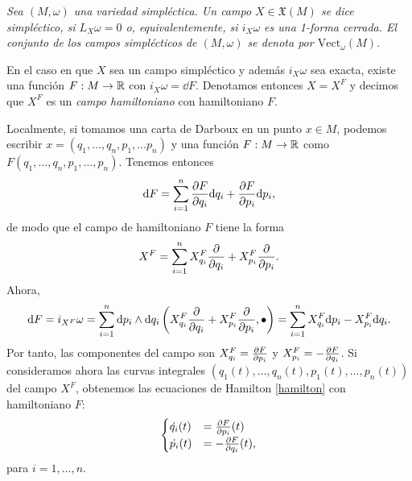 \begin{defn}
  \em
  Sea $(M,\omega)$ una variedad simpléctica. Un campo $X\in \mathfrak{X}(M)$ se dice \emph{simpléctico}, si $L_X\omega=0$ o, equivalentemente, si $i_X\omega$ es una 1-forma cerrada. El conjunto de los campos simplécticos de $(M,\omega)$ se denota por $\mathrm{Vect}_{\omega}(M)$.

  En el caso en que $X$ sea un campo simpléctico y además $i_X\omega$ sea exacta, existe una función $F:M\rightarrow \mathbb{R}$ con $i_X\omega=\dd F$. Denotamos entonces $X=X^F$ y decimos que $X^F$ es un \emph{campo hamiltoniano} con hamiltoniano $F$.
\end{defn}

Localmente, si tomamos una carta de Darboux en un punto $x\in M$, podemos escribir $x=(q_1,\dots,q_n,p_1,\dots p_n)$ y una función $F:M\rightarrow \mathbb{R}$ como $F(q_1,\dots,q_n,p_1,\dots,p_n)$. Tenemos entonces
\begin{equation*}
  \mathrm{d} F=\sum_{i=1}^n \frac{\partial F}{\partial q_i}\mathrm{d} q_i + \frac{\partial F}{\partial p_i} \mathrm{d} p_i,
\end{equation*}
de modo que el campo de hamiltoniano $F$ tiene la forma
\begin{equation*}
    X^F = \sum_{i=1}^n X_{q_i}^F \frac{\partial}{\partial q_i} + X_{p_i}^F \frac{\partial}{\partial p_i}.
\end{equation*}
  Ahora, 
  \begin{equation*}
    \mathrm{d} F = i_{X^F}\omega= \sum_{i=1}^n \mathrm{d} p_i \wedge \mathrm{d} q_i \left(X_{q_i}^F \frac{\partial}{\partial q_i} + X^F_{p_i} \frac{\partial}{\partial p_i},\bullet\right)  = \sum_{i=1}^n X_{q_i}^F \mathrm{d} p_i -X_{p_i}^F \mathrm{d} q_i.
  \end{equation*}
  Por tanto, las componentes del campo son $X^F_{q_i}=\frac{\partial F}{\partial p_i}$ y $X^F_{p_i}=-\frac{\partial F}{\partial q_i}$. Si consideramos ahora las curvas integrales $(q_1(t),\dots,q_n(t),p_1(t),\dots,p_n(t))$ del campo $X^F$, obtenemos las ecuaciones de Hamilton \eqref{hamilton} con hamiltoniano $F$:
  \begin{equation*}
  \begin{cases}
     \dot{q_i}(t) & = \frac{\partial F}{\partial p_i}(t) \\
     \dot{p_i}(t) & = -\frac{\partial F}{\partial q_i} (t),
  \end{cases}
\end{equation*}
  para $i=1,\dots,n$.

